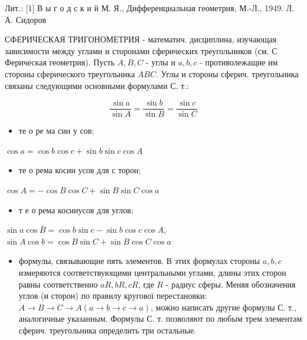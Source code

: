 \documentclass[10pt]{article}
\begin{document}
Лит.: [1] В ы г о д с к и й М. Я., Дифференциальная геометрия, М.-Л., 1949. Л. А. Сидоров



СФЕРИЧЕСКАЯ ТРИГОНОМЕТРИЯ - математич. дисциплина, изучающая зависимости между углами и сторонами сферических треугольников (см. С Ферическая геометрия). Пусть $A, B, C$ - углы и $a, b, c$ - противолежащие им стороны сферического треугольника $A B C$. Углы и стороны сферич. треугольника связаны следующими основными формулами С. т.:



\[

\frac{\sin a}{\sin A}=\frac{\sin b}{\sin B}=\frac{\sin c}{\sin C}

\]



\begin{itemize}

  \item те о ре ма син у сов;

\end{itemize}



$\cos a=\cos b \cos c+\sin b \sin c \cos A$



\begin{itemize}

  \item те о рема косин усов для с торон;

\end{itemize}



$\cos A=-\cos B \cos C+\sin B \sin C \cos a$



\begin{itemize}

  \item т е о рема косинусов для углов;

\end{itemize}



$\sin a \cos \bar{B}=\cos b \sin c-\sin b \cos c \cos A$, $\sin A \cos b=\cos B \sin C+\sin B \cos C \cos a$



\begin{itemize}

  \item формулы, связывающие пять элементов. В этих формулах стороны $a, b, c$ измеряются соответствующими центральными углами, длины этих сторон равны соответственно $a R, b R, c R$, где $R$ - радиус сферы. Меняя обозначения углов (и сторон) по правилу кругової перестановки: $A \longrightarrow B \longrightarrow C \longrightarrow A(a \longrightarrow b \longrightarrow c \longrightarrow a)$, можно написать другие формулы С. т., аналогичные указанным. Формулы С. т. позволяют по любым трем элементам сферич. треугольника определить три остальные.

\end{itemize}
\end{document}
